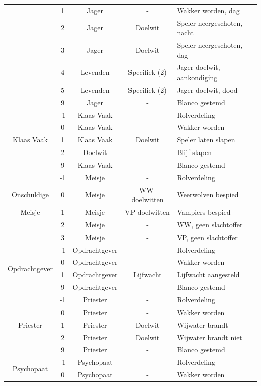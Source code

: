 \documentclass[12pt]{article}
\begin{document}
\begin{center}
\begin{longtable}{c|c|c|c|l}
       & 1 & Jager & - & Wakker worden, dag \\
       & 2 & Jager & Doelwit & Speler neergeschoten, nacht \\
       & 3 & Jager & Doelwit & Speler neergeschoten, dag \\
       & 4 & Levenden & Specifiek (2) & Jager doelwit, aankondiging \\
       & 5 & Levenden & Specifiek (2) & Jager doelwit, dood \\
       & 9 & Jager & - & Blanco gestemd \\
      \hline
      \multirow{5}{*}{Klaas Vaak} & -1 & Klaas Vaak & - & Rolverdeling \\
       & 0 & Klaas Vaak & - & Wakker worden \\
       & 1 & Klaas Vaak & Doelwit & Speler laten slapen \\
       & 2 & Doelwit & - & Blijf slapen \\
       & 9 & Klaas Vaak & - & Blanco gestemd \\
      \hline
       & -1 & Meisje & - & Rolverdeling \\
      Onschuldige & 0 & Meisje & WW-doelwitten & Weerwolven bespied \\
      Meisje & 1 & Meisje & VP-doelwitten & Vampiers bespied \\
       & 2 & Meisje & - & WW, geen slachtoffer \\
       & 3 & Meisje & - & VP, geen slachtoffer \\
      \hline
      \multirow{4}{*}{Opdrachtgever} & -1 & Opdrachtgever & - & Rolverdeling \\
       & 0 & Opdrachtgever & - & Wakker worden \\
       & 1 & Opdrachtgever & Lijfwacht & Lijfwacht aangesteld \\
       & 9 & Opdrachtgever & - & Blanco gestemd \\
      \hline
      \multirow{5}{*}{Priester} & -1 & Priester & - & Rolverdeling \\
       & 0 & Priester & - & Wakker worden \\
       & 1 & Priester & Doelwit & Wijwater brandt \\
       & 2 & Priester & Doelwit & Wijwater brandt niet \\
       & 9 & Priester & - & Blanco gestemd \\
      \hline
      \multirow{4}{*}{Psychopaat} & -1 & Psychopaat & - & Rolverdeling \\
       & 0 & Psychopaat & - & Wakker worden \\

\end{longtable}
\end{center}
\end{document}
